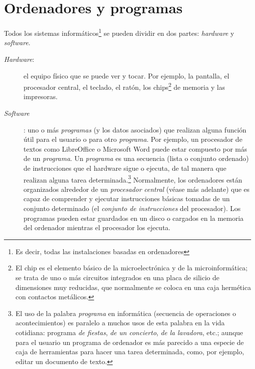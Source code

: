 \chapter{Ordenadores y programas} 

 \label{se:OiP} 

Todos los sistemas informáticos\footnote{Es decir, todas las instalaciones basadas en ordenadores} se pueden dividir en dos partes: \emph{hardware} y \emph{software}. 

\begin{description} \item[\emph{Hardware}:] el equipo físico que se puede ver y tocar. Por ejemplo, la pantalla, el procesador central, el teclado, el ratón, los chips\footnote{El chip es el elemento básico de la microelectrónica y de la microinformática; se trata de uno o más circuitos integrados en una placa de silicio de dimensiones muy reducidas, que normalmente se coloca en una caja hermética con contactos metálicos.} de memoria y las impresoras. 

\item[\emph{Software}]: uno o más \emph{programas} (y los datos asociados) que realizan alguna función útil para el usuario o para otro \emph{programa}. Por ejemplo, un procesador de textos como LibreOffice o Microsoft Word puede estar compuesto por más de un \emph{programa}. Un \emph{programa} es una secuencia (lista o conjunto ordenado) de instrucciones que el hardware sigue o ejecuta, de tal manera que realizan alguna tarea determinada.\footnote{El uso de la palabra \emph{programa} en informática (secuencia de operaciones o acontecimientos) es paralelo a muchos usos de esta palabra en la vida cotidiana: programa \emph{de fiestas}, \emph{de un concierto}, \emph{de la lavadora}, etc.; aunque para el usuario un programa de ordenador es más parecido a una especie de caja de herramientas para hacer una tarea determinada, como, por ejemplo, editar un documento de texto.} Normalmente, los ordenadores están organizados alrededor de un \emph{procesador central} (véase más adelante) que es capaz de comprender y ejecutar instrucciones básicas tomadas de un conjunto determinado (el \emph{conjunto de instrucciones} del procesador). Los programas pueden estar guardados en un disco o cargados en la memoria del ordenador mientras el procesador los ejecuta. \end{description} 

